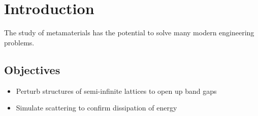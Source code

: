 \chapter{Introduction}
The study of metamaterials has the potential to solve many modern engineering
problems.

\section{Objectives}
\begin{itemize}
\item Perturb structures of semi-infinite lattices to open up band gaps
\item Simulate scattering to confirm dissipation of energy
\end{itemize}
